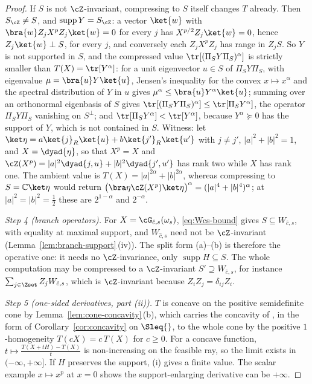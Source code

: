 \begin{proof}
If $S$ is not $\cZ$-invariant, compressing to $S$ itself changes $T$
already. Then $S_{\cZ}\ne S$, and $\operatorname{supp}Y=S_{\cZ}$: a vector
$\ket{w}$ with $\bra{w}Z_jX^{p}Z_j\ket{w}=0$ for every $j$ has
$X^{p/2}Z_j\ket{w}=0$, hence $Z_j\ket{w}\perp S$, for every $j$, and
conversely each $Z_jX^{p}Z_j$ has range in $Z_jS$. So $Y$ is not supported
in $S$, and the compressed value $\tr[(\Pi_SY\Pi_S)^{\alpha}]$ is strictly
smaller than $T(X)=\tr[Y^{\alpha}]$: for a unit eigenvector $u\in S$ of
$\Pi_SY\Pi_S$, with eigenvalue $\mu=\bra{u}Y\ket{u}$, Jensen's inequality
for the convex $x\mapsto x^{\alpha}$ and the spectral distribution of $Y$
in $u$ gives $\mu^{\alpha}\le\bra{u}Y^{\alpha}\ket{u}$; summing over an
orthonormal eigenbasis of $S$ gives
$\tr[(\Pi_SY\Pi_S)^{\alpha}]\le\tr[\Pi_SY^{\alpha}]$, the operator
$\Pi_SY\Pi_S$ vanishing on $S^{\perp}$; and
$\tr[\Pi_SY^{\alpha}]<\tr[Y^{\alpha}]$, because $Y^{\alpha}\succeq0$ has the
support of $Y$, which is not contained in $S$. Witness: let
$\ket\eta=a\ket{j}_R\ket{u}+b\ket{j'}_R\ket{u'}$ with $j\ne j'$,
$|a|^{2}+|b|^{2}=1$, and $X=\dyad{\eta}$, so that $X^{p}=X$ and
$\cZ(X^{p})=|a|^{2}\dyad{j,u}+|b|^{2}\dyad{j',u'}$ has rank two while $X$
has rank one. The ambient value is
$T(X)=|a|^{2\alpha}+|b|^{2\alpha}$, whereas compressing to
$S=\mathbb{C}\ket\eta$ would return
$\big(\bra\eta\cZ(X^{p})\ket\eta\big)^{\alpha}
=(|a|^{4}+|b|^{4})^{\alpha}$; at $|a|^{2}=|b|^{2}=\tfrac12$ these are
$2^{1-\alpha}$ and $2^{-\alpha}$.

\emph{Step 4 (branch operators).} For $X=\cG_{\hat c,s}(\omega_s)$,
\eqref{eq:Wcs-bound} gives $S\subseteq W_{\hat c,s}$, with equality at
maximal support, and $W_{\hat c,s}$ need not be $\cZ$-invariant
(Lemma~\ref{lem:branch-support}\,(iv)). The split form (a)--(b) is
therefore the operative one: it needs no $\cZ$-invariance, only
$\operatorname{supp}H\subseteq S$. The whole computation may be
compressed to a $\cZ$-invariant $S'\supseteq W_{\hat c,s}$, for instance
$\sum_{j\in\Zset}Z_jW_{\hat c,s}$, which is $\cZ$-invariant because
$Z_iZ_j=\delta_{ij}Z_i$.

\emph{Step 5 (one-sided derivatives, part (ii)).} $T$ is concave on the
positive semidefinite cone by Lemma~\ref{lem:cone-concavity}\,(b), which
carries the concavity of , in the form of
Corollary~\ref{cor:concavity} on $\Sleq{}$, to the whole cone by the
positive $1$-homogeneity $T(cX)=c\,T(X)$ for $c\ge0$. For a concave
function, $t\mapsto\frac{T(X+tH)-T(X)}{t}$ is non-increasing on the
feasible ray, so the limit exists in $(-\infty,+\infty]$. If $H$
preserves the support, (i) gives a finite value. The scalar example
$x\mapsto x^{p}$ at $x=0$ shows the support-enlarging derivative can be
$+\infty$.
\end{proof}
